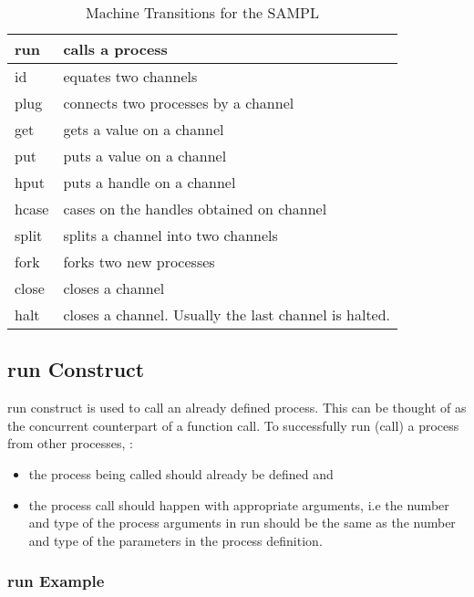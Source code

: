 \documentclass[11pt]{article}
\newcommand{\<}{\langle}
\renewcommand{\>}{\rangle}
\begin{document}
\begin{table}
\begin{center}
    \begin{tabular}{|l||l|}
    \hline 
        {\sf run} & calls a process \\ \hline 
        {\sf id}  & equates two channels \\ \hline 
        {\sf plug} & connects two processes by a channel \\ \hline  
        {\sf get} & gets a value on a channel \\ \hline 
        {\sf put} & puts a value on a channel \\ \hline 
        {\sf hput} & puts a handle on a channel \\ \hline 
        {\sf hcase} & cases on the handles obtained on channel \\ \hline 
        {\sf split} & splits a channel into two channels \\ \hline 
        {\sf fork} & forks two new processes \\ \hline 
        {\sf close} & closes a channel \\ \hline 
        {\sf halt} & closes a channel. Usually the last channel is halted. \\ \hline
   \end{tabular}
\caption{Machine Transitions for the SAMPL}
\label{Conc:constr_desc}
\end{center}
\end{table}


\subsection{run Construct}\label{conc:run_desc}
{\sf run} construct is used to call an already defined process. This can be thought of as the concurrent counterpart of a function call. To successfully {\sf run} (call) a process from other processes, :
\begin{itemize}
  \item the process being called should already be defined and
  \item the process call should happen with appropriate arguments, i.e the number and type of the process arguments in {\sf run} should be the same as the number and type of the parameters in the process definition.
\end {itemize}
\subsubsection {run Example} 
\end{document}
